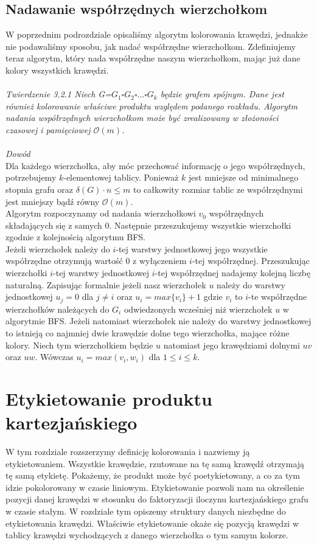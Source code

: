 \documentclass[12pt,a4paper,titlepage]{article}
\begin{document}
\subsection{Nadawanie współrzędnych wierzchołkom}
W poprzednim podrozdziale opisaliśmy algorytm kolorowania krawędzi, jednakże nie podawaliśmy sposobu, jak nadać współrzędne wierzchołkom. Zdefiniujemy teraz algorytm, który nada współrzędne naszym wierzchołkom, mając już dane kolory wszystkich krawędzi.\\
\\
\textit{Twierdzenie 3.2.1 Niech G=$G_1 \square G_2 \square ... \square G_k$ będzie grafem spójnym. Dane jest również kolorowanie właściwe produktu względem podanego rozkładu. Algorytm nadania współrzędnych wierzchołkom może być zrealizowany w złożoności czasowej i pamięciowej $\mathcal{O}(m)$.}\\
\\
\textit{Dowód}\\
Dla każdego wierzchołka, aby móc przechować informację o jego współrzędnych, potrzebujemy $k$-elementowej tablicy. Ponieważ $k$ jest mniejsze od minimalnego stopnia grafu oraz $\delta(G) \cdot n \leqslant m$ to całkowity rozmiar tablic ze współrzędnymi jest mniejszy bądź równy $\mathcal{O}(m)$.\\
Algorytm rozpoczynamy od nadania wierzchołkowi $v_0$ współrzędnych składających się z samych 0. Następnie przeszukujemy wszystkie wierzchołki zgodnie z kolejnością algorytmu BFS. \\Jeżeli wierzchołek należy do $i$-tej warstwy jednostkowej jego wszystkie współrzędne otrzymują wartość 0 z wyłączeniem $i$-tej współrzędnej. Przeszukując wierzchołki $i$-tej warstwy jednostkowej $i$-tej współrzędnej nadajemy kolejną liczbę naturalną. Zapisując formalnie jeżeli nasz wierzchołek $u$ należy do warstwy jednostkowej $u_j =0$ dla $j \neq i$
oraz $u_i = max\{v_i\}+1$ gdzie $v_i $ to $i$-te współrzędne wierzchołków należących do $G_i$ odwiedzonych wcześniej niż wierzchołek $u$ w algorytmie BFS. 
Jeżeli natomiast wierzchołek nie należy do warstwy jednostkowej to istnieją co najmniej dwie krawędzie dolne tego wierzchołka, mające różne kolory. Niech tym wierzchołkiem będzie $u$ natomiast jego krawędziami dolnymi $uv$ oraz $uw$. Wówczas $u_i = max(v_i , w_i )$ dla $1 \leqslant i \leqslant k$.


\section{Etykietowanie produktu kartezjańskiego}
W tym rozdziale rozszerzymy definicję kolorowania i nazwiemy ją etykietowaniem. Wszystkie krawędzie, rzutowane na tę samą krawędź otrzymają tę samą etykietę. Pokażemy, że produkt może być poetykietowany, a co za tym idzie pokolorowany w czasie liniowym. Etykietowanie pozwoli nam na określenie pozycji danej krawędzi w stosunku do faktoryzacji iloczynu kartezjańskiego grafu w czasie stałym. W rozdziale tym opiszemy struktury danych niezbędne do etykietowania krawędzi. Właściwie etykietowanie okaże się pozycją krawędzi w tablicy krawędzi wychodzących z danego wierzchołka o tym samym kolorze. \\
\end{document}
